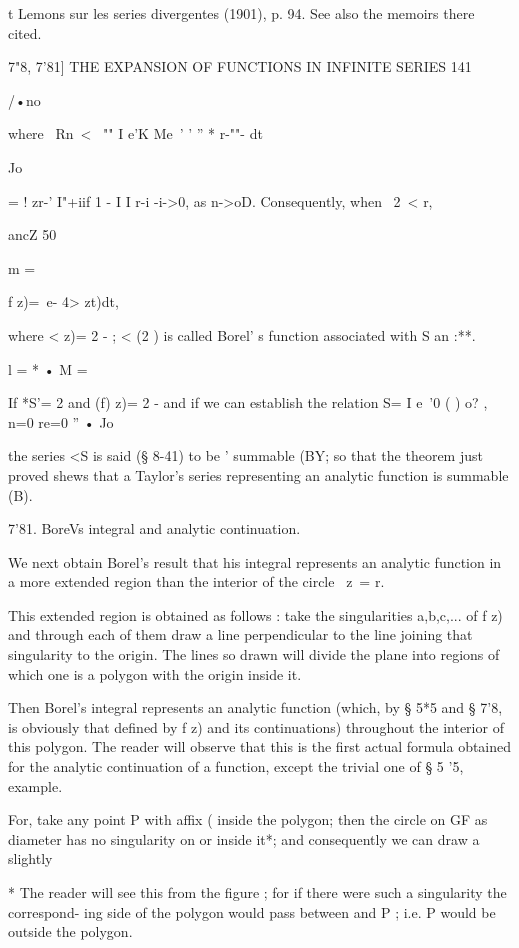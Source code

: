 {t Lemons sur les series divergentes (1901), p. 94. See also the
memoirs there cited.

7"8, 7'81] THE EXPANSION OF FUNCTIONS IN INFINITE SERIES 141

/•no

where \ Rn\ < \ "" I e'K Me\ ' ' '' * r-""- dt

Jo

= ! zr-' I"+iif 1 - I I r-i -i->0, as n->oD. Consequently, when \ 2\ <
r,

ancZ 50

m =

f z)=\ e- 4> zt)dt,

where < z)= 2 - ; < (2 ) is called Borel' s function associated with S
an :**.

 l = * • M =

If *S'= 2 and (f) z)= 2 - and if we can establish the relation S= I
e~'0 ( ) o? , n=0 re=0 '' • Jo

the series <S is said (§ 8-41) to be ' summable (BY; so that the
theorem just proved shews that a Taylor's series representing an
analytic function is summable (B).

7'81. BoreVs integral and analytic continuation.

We next obtain Borel's result that his integral represents an analytic
function in a more extended region than the interior of the circle \
z\ = r.

This extended region is obtained as follows : take the singularities
a,b,c,... of f z) and through each of them draw a line perpendicular
to the line joining that singularity to the origin. The lines so drawn
will divide the plane into regions of which one is a polygon with the
origin inside it.

Then Borel's integral represents an analytic function (which, by § 5*5
and § 7'8, is obviously that defined by f z) and its continuations)
throughout the interior of this polygon. The reader will observe that
this is the first actual formula obtained for the analytic
continuation of a function, except the trivial one of § 5 '5, example.

For, take any point P with affix ( inside the polygon; then the circle
on GF as diameter has no singularity on or inside it*; and
consequently we can draw a slightly

* The reader will see this from the figure ; for if there were such a
singularity the correspond- ing side of the polygon would pass between
and P ; i.e. P would be outside the polygon.

}
